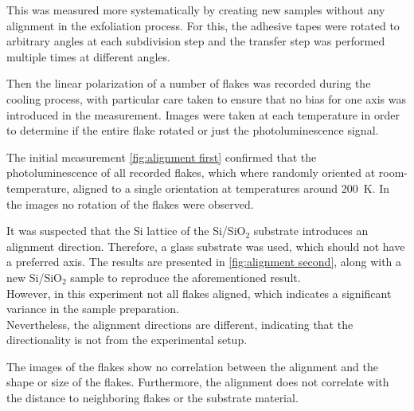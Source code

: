 \documentclass[
	oneside,
	parskip=half,
	a4paper,
]{scrbook}
\begin{document}
This was measured more systematically by creating new samples without any alignment in the exfoliation process.
For this, the adhesive tapes were rotated to arbitrary angles at each subdivision step and the transfer step was performed multiple times at different angles.

Then the linear polarization of a number of flakes was recorded during the cooling process, with particular care taken to ensure that no bias for one axis was introduced in the measurement.
Images were taken at each temperature in order to determine if the entire flake rotated or just the photoluminescence signal. 

The initial measurement \autoref{fig:alignment first} confirmed that the photoluminescence of all recorded flakes, which where randomly oriented at room-temperature, aligned to a single orientation at temperatures around \SI{200}{K}.
In the images no rotation of the flakes were observed.

It was suspected that the Si lattice of the Si/SiO$_2$ substrate introduces an alignment direction.
Therefore, a glass substrate was used, which should not have a preferred axis.  
The results are presented in \autoref{fig:alignment second}, along with a new Si/SiO$_2$ sample to reproduce the aforementioned result.\\
However, in this experiment not all flakes aligned, which indicates a significant variance in the sample preparation.\\
Nevertheless, the alignment directions are different, indicating that the directionality is not from the experimental setup.

The images of the flakes show no correlation between the alignment and the shape or size of the flakes. 
Furthermore, the alignment does not correlate with the distance to neighboring flakes or the substrate material.
\end{document}
